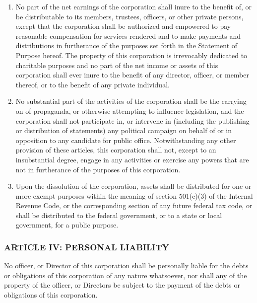 \documentclass[12pt]{article}
\begin{document}
\begin{enumerate}

\item No part of the net earnings of the corporation shall inure to
  the benefit of, or be distributable to its members, trustees,
  officers, or other private persons, except that the corporation
  shall be authorized and empowered to pay reasonable compensation for
  services rendered and to make payments and distributions in
  furtherance of the purposes set forth in the Statement of Purpose
  hereof. The property of this corporation is irrevocably dedicated to
  charitable purposes and no part of the net income or assets of this
  corporation shall ever inure to the benefit of any director,
  officer, or member thereof, or to the benefit of any private
  individual. 

\item No substantial part of the activities of the corporation shall
  be the carrying on of propaganda, or otherwise attempting to
  influence legislation, and the corporation shall not participate in,
  or intervene in (including the publishing or distribution of
  statements) any political campaign on behalf of or in opposition to
  any candidate for public office. Notwithstanding any other provision
  of these articles, this corporation shall not, except to an
  insubstantial degree, engage in any activities or exercise any
  powers that are not in furtherance of the purposes of this
  corporation.

\item Upon the dissolution of the corporation, assets shall be
  distributed for one or more exempt purposes within the meaning of
  section 501(c)(3) of the Internal Revenue Code, or the corresponding
  section of any future federal tax code, or shall be distributed to
  the federal government, or to a state or local government, for a
  public purpose.

\end{enumerate}


\subsubsection*{ARTICLE IV: PERSONAL LIABILITY}

No officer, or Director of this corporation shall be personally liable
for the debts or obligations of this corporation of any nature
whatsoever, nor shall any of the property of the officer, or Directors
be subject to the payment of the debts or obligations of this
corporation.
\end{document}
